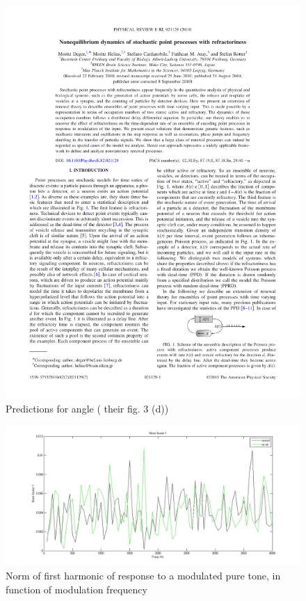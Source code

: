 \begin{figure}[h]
	\centering
	\includegraphics*[page=4,viewport=433 567 566 617]{images/Deger2010.pdf} %
	\caption{Predictions for angle (\cite{Deger} their fig. 3 (d))}
	\label{fig:predangle}
\end{figure}

\begin{figure}[ht]
	\centering
  \includegraphics[width=\textwidth]{images/norm1.jpg}
	\caption{Norm of first harmonic of response to a modulated pure tone, in function of modulation frequency}
	\label{fig:norm1}
\end{figure}

